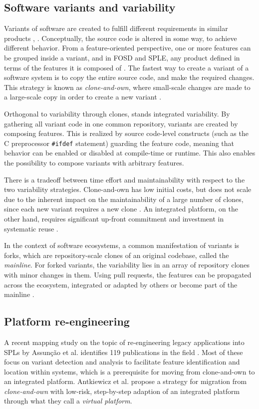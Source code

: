 \subsection{Software variants and variability}
Variants of software are created to fulfill different requirements in similar products \cite{antkiewicz2014flexible}, \cite{stanciulescu2015}. Conceptually, the source code is altered in some way, to achieve different behavior. From a feature-oriented perspective, one or more features can be grouped inside a variant, and in FOSD and SPLE, any product defined in terms of the features it is composed of \cite{apel2009overview}. The fastest way to create a variant of a software system is to copy the entire source code, and make the required changes. This strategy is known as \textit{clone-and-own}, where small-scale changes are made to a large-scale copy in order to create a new variant \cite{stanciulescu2015}.

Orthogonal to variability through clones, stands integrated variability. By gathering all variant code in one common repository, variants are created by composing features. This is realized by source code-level constructs (such as the C preprocessor \texttt{\#ifdef} statement) guarding the feature code, meaning that behavior can be enabled or disabled at compile-time or runtime. This also enables the possibility to compose variants with arbitrary features.

There is a tradeoff between time effort and maintainability with respect to the two variability strategies. Clone-and-own has low initial costs, but does not scale due to the inherent impact on the maintainability of a large number of clones, since each new variant requires a new clone \cite{antkiewicz2014flexible}. An integrated platform, on the other hand, requires significant up-front commitment and investment in systematic reuse \cite{antkiewicz2014flexible}.

In the context of software ecosystems, a common manifestation of variants is forks, which are repository-scale clones of an original codebase, called the \textit{mainline}. For forked variants, the variability lies in an array of repository clones with minor changes in them. Using pull requests, the features can be propagated across the ecosystem, integrated or adapted by others or become part of the mainline \cite{stanciulescu2015}.

\subsection{Platform re-engineering}
A recent mapping study on the topic of re-engineering legacy applications into SPLs by Assun{\c{c}}{\~a}o et al. identifies 119 publications in the field \cite{assuncao2017mapping}. Most of these focus on variant detection and analysis to facilitate feature identification and location within systems, which is a prerequisite for moving from clone-and-own to an integrated platform. Antkiewicz et al. \cite{antkiewicz2014flexible} propose a strategy for migration from \textit{clone-and-own} with low-risk, step-by-step adaption of an integrated platform through what they call a \textit{virtual platform}. 

